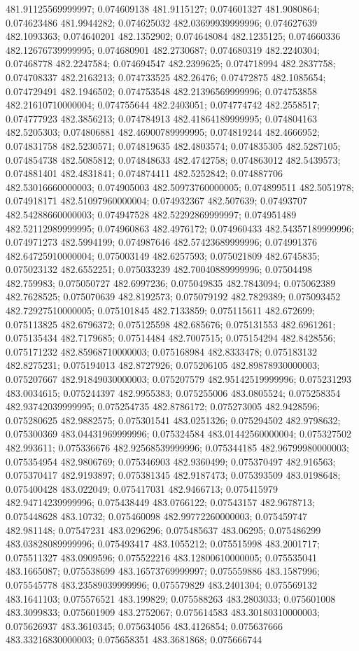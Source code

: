 481.91125569999997; 0.074609138 481.9115127; 0.074601327 481.9080864; 0.074623486 481.9944282; 0.074625032 482.03699939999996; 0.074627639 482.1093363; 0.074640201 482.1352902; 0.074648084 482.1235125; 0.074660336 482.12676739999995; 0.074680901 482.2730687; 0.074680319 482.2240304; 0.07468778 482.2247584; 0.074694547 482.2399625; 0.074718994 482.2837758; 0.074708337 482.2163213; 0.074733525 482.26476; 0.07472875 482.1085654; 0.074729491 482.1946502; 0.074753548 482.21396569999996; 0.074753858 482.21610710000004; 0.074755644 482.2403051; 0.074774742 482.2558517; 0.074777923 482.3856213; 0.074784913 482.41864189999995; 0.074804163 482.5205303; 0.074806881 482.46900789999995; 0.074819244 482.4666952; 0.074831758 482.5230571; 0.074819635 482.4803574; 0.074835305 482.5287105; 0.074854738 482.5085812; 0.074848633 482.4742758; 0.074863012 482.5439573; 0.074881401 482.4831841; 0.074874411 482.5252842; 0.074887706 482.53016660000003; 0.074905003 482.50973760000005; 0.074899511 482.5051978; 0.074918171 482.51097960000004; 0.074932367 482.507639; 0.07493707 482.54288660000003; 0.074947528 482.52292869999997; 0.074951489 482.52112989999995; 0.074960863 482.4976172; 0.074960433 482.54357189999996; 0.074971273 482.5994199; 0.074987646 482.57423689999996; 0.074991376 482.64725910000004; 0.075003149 482.6257593; 0.075021809 482.6745835; 0.075023132 482.6552251; 0.075033239 482.70040889999996; 0.07504498 482.759983; 0.075050727 482.6997236; 0.075049835 482.7843094; 0.075062389 482.7628525; 0.075070639 482.8192573; 0.075079192 482.7829389; 0.075093452 482.72927510000005; 0.075101845 482.7133859; 0.075115611 482.672699; 0.075113825 482.6796372; 0.075125598 482.685676; 0.075131553 482.6961261; 0.075135434 482.7179685; 0.07514484 482.7007515; 0.075154294 482.8428556; 0.075171232 482.85968710000003; 0.075168984 482.8333478; 0.075183132 482.8275231; 0.075194013 482.8727926; 0.075206105 482.89878930000003; 0.075207667 482.91849030000003; 0.075207579 482.95142519999996; 0.075231293 483.0034615; 0.075244397 482.9955383; 0.075255006 483.0805524; 0.075258354 482.93742039999995; 0.075254735 482.8786172; 0.075273005 482.9428596; 0.075280625 482.9882575; 0.075301541 483.0251326; 0.075294502 482.9798632; 0.075300369 483.04431969999996; 0.075324584 483.01442560000004; 0.075327502 482.993611; 0.075336676 482.92568539999996; 0.075344185 482.96799980000003; 0.075354954 482.9806769; 0.075346903 482.9360499; 0.075370497 482.916563; 0.075370417 482.9193897; 0.075381345 482.9187473; 0.075393509 483.0198648; 0.075400428 483.022049; 0.075417031 482.9466713; 0.075415979 482.94714239999996; 0.075438449 483.0766122; 0.07543157 482.9678713; 0.075448628 483.10732; 0.075460098 482.99772260000003; 0.075459747 482.981148; 0.07547231 483.0296296; 0.075485637 483.06295; 0.075486299 483.03828089999996; 0.075493417 483.1055212; 0.075515998 483.2001717; 0.075511327 483.0909596; 0.075522216 483.12800610000005; 0.075535041 483.1665087; 0.075538699 483.16573769999997; 0.075559886 483.1587996; 0.075545778 483.23589039999996; 0.075579829 483.2401304; 0.075569132 483.1641103; 0.075576521 483.199829; 0.075588263 483.2803033; 0.075601008 483.3099833; 0.075601909 483.2752067; 0.075614583 483.30180310000003; 0.075626937 483.3610345; 0.075634056 483.4126854; 0.075637666 483.33216830000003; 0.075658351 483.3681868; 0.075666744 